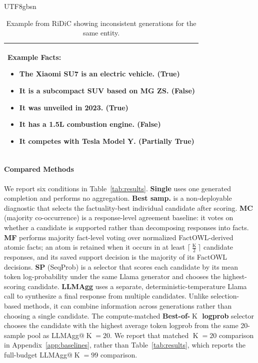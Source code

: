 \documentclass[11pt]{article}
\begin{document}
\begin{CJK*}{UTF8}{gbsn}
\begin{table}
\begin{tabular}{p{}}
\textbf{Example Facts:}
\begin{itemize}
    \item The Xiaomi SU7 is an electric vehicle. \hfill (True)
    \item It is a subcompact SUV based on MG ZS. \hfill (False)
    \item It was unveiled in 2023. \hfill (True)
    \item It has a 1.5L combustion engine. \hfill (False)
    \item It competes with Tesla Model Y. \hfill (Partially True)
\end{itemize}
\\
\bottomrule
\end{tabular}
\caption{Example from RiDiC showing inconsistent generations for the same entity.}
\label{tab:ridicexample}
\end{table}

\paragraph{Compared Methods}

We report six conditions in Table~\ref{tab:results}. \textbf{Single} uses one generated completion and performs no aggregation. \textbf{Best samp.} is a non-deployable diagnostic that selects the factuality-best individual candidate after scoring. \textbf{MC} (majority co-occurrence) is a response-level agreement baseline: it votes on whether a candidate is supported rather than decomposing responses into facts. \textbf{MF} performs majority fact-level voting over normalized FactOWL-derived atomic facts; an atom is retained when it occurs in at least $\lceil \frac{\operatorname{K}}{2}\rceil$ candidate responses, and its saved support decision is the majority of its FactOWL decisions. \textbf{SP} (SeqProb) is a selector that scores each candidate by its mean token log-probability under the same Llama generator and chooses the highest-scoring candidate. \textbf{LLMAgg} uses a separate, deterministic-temperature Llama call to synthesize a final response from multiple candidates. Unlike selection-based methods, it can combine information across generations rather than choosing a single candidate. The compute-matched \textbf{Best-of-$\operatorname{K}$ logprob} selector chooses the candidate with the highest average token logprob from the same 20-sample pool as LLMAgg@$\operatorname{K}{=}20$. We report that matched $\operatorname{K}{=}20$ comparison in Appendix~\ref{app:baselines}, rather than Table~\ref{tab:results}, which reports the full-budget LLMAgg@$\operatorname{K}{=}99$ comparison.


\end{CJK*}
\end{document}
